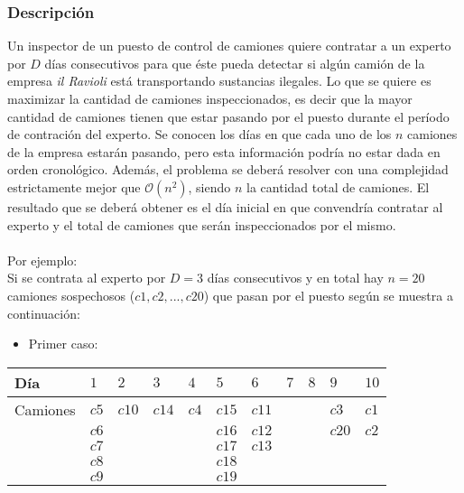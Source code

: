 \documentclass[11pt, a4paper, twoside]{article}
\begin{document}
{}

\subsubsection{Descripción}
Un inspector de un puesto de control de camiones quiere contratar a un experto por $D$ días consecutivos para que \'este pueda detectar si alg\'un cami\'on de la empresa \textit{il Ravioli} est\'a transportando sustancias ilegales. Lo que se quiere es maximizar la cantidad de camiones inspeccionados, es decir que la mayor cantidad de camiones tienen que estar pasando por el puesto durante el per\'iodo de contraci\'on del experto. Se conocen los d\'ias en que cada uno de los $n$ camiones de la empresa estar\'an pasando, pero esta informaci\'on podr\'ia no estar dada en orden cronol\'ogico. Adem\'as, el problema se deber\'a resolver con una complejidad estrictamente mejor que $\mathcal{O}(n^{2})$, siendo $n$ la cantidad total de camiones. El resultado que se deber\'a obtener es el d\'ia inicial en que convendr\'ia contratar al experto y el total de camiones que ser\'an inspeccionados por el mismo.\\
\\
Por ejemplo: 
\\
Si se contrata al experto por $D=3$ d\'ias consecutivos y en total hay $n=20$ camiones sospechosos ($c1,c2,...,c20$) que pasan por el puesto seg\'un se muestra a continuaci\'on: \\ 

\begin{itemize}
	\item Primer caso:
\end{itemize} 

\begin{tabular}{|l|l|l|l|l|l|l|l|l|l|l|}
	\hline
	Día          &  $1$  & $2$   & $3$   & $4$   & $5$   & $6$ & $7$ & $8$ & $9$   & $10$  \\
	\hline
	Camiones     &  $c5$ & $c10$ & $c14$ & $c4$  & $c15$ & $c11$ &   &     & $c3$  & $c1$  \\
				 &  $c6$ &       &       &       & $c16$ & $c12$ &   &     & $c20$ & $c2$  \\    
				 &	$c7$ &       &       &       & $c17$ & $c13$ &   &     &       &       \\  
				 &	$c8$ &       &       &       & $c18$ &       &   &     &       &       \\
				 &	$c9$ &       &       &       & $c19$ &       &   &     &       &       \\
	\hline
\end{tabular} \\
\end{document}
